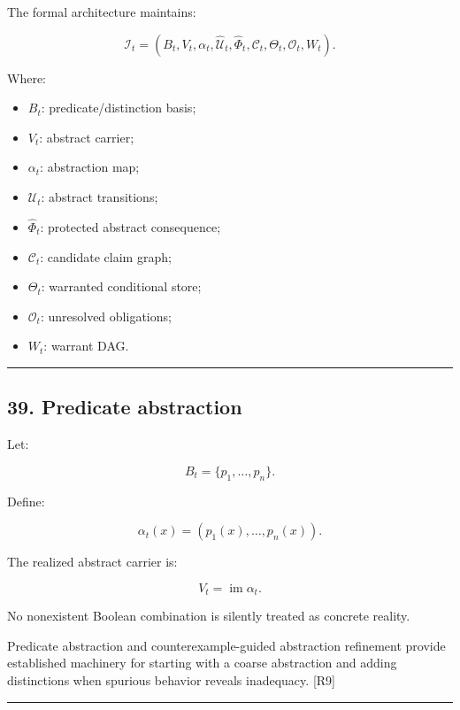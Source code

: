 \documentclass[
]{article}
\providecommand{\tightlist}{%
  \setlength{\itemsep}{0pt}\setlength{\parskip}{0pt}}
\begin{document}
The formal architecture maintains:

\[
\boxed{
\mathcal I_t
=
(
B_t,
V_t,
\alpha_t,
\widehat{\mathcal U}_t,
\widehat\Phi_t,
\mathcal C_t,
\Theta_t,
\mathcal O_t,
W_t
).
}
\]

Where:

\begin{itemize}
\tightlist
\item
  \(B_t\): predicate/distinction basis;
\item
  \(V_t\): abstract carrier;
\item
  \(\alpha_t\): abstraction map;
\item
  \(\widehat{\mathcal U}_t\): abstract transitions;
\item
  \(\widehat\Phi_t\): protected abstract consequence;
\item
  \(\mathcal C_t\): candidate claim graph;
\item
  \(\Theta_t\): warranted conditional store;
\item
  \(\mathcal O_t\): unresolved obligations;
\item
  \(W_t\): warrant DAG.
\end{itemize}

\begin{center}\rule{0.5\linewidth}{0.5pt}\end{center}

\subsection{39. Predicate abstraction}\label{predicate-abstraction}

Let:

\[
B_t=\{p_1,\ldots,p_n\}.
\]

Define:

\[
\boxed{
\alpha_t(x)
=
(p_1(x),\ldots,p_n(x)).
}
\]

The realized abstract carrier is:

\[
\boxed{
V_t
=
\operatorname{im}\alpha_t.
}
\]

No nonexistent Boolean combination is silently treated as concrete
reality.

Predicate abstraction and counterexample-guided abstraction refinement
provide established machinery for starting with a coarse abstraction and
adding distinctions when spurious behavior reveals inadequacy. {[}R9{]}

\begin{center}\rule{0.5\linewidth}{0.5pt}\end{center}
\end{document}
